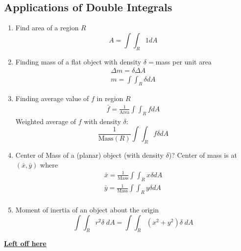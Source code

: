 \documentclass[../main.tex]{subfiles}
\begin{document}
\subsection{Applications of Double Integrals}
\begin{enumerate}
	\item Find area of a region $R$
	\begin{equation*}
		A = \int \int_R 1 dA 
	\end{equation*}
	\item Finding mass of a flat object with density $\delta = $mass per unit area
	\begin{align*}
		\Delta m = \delta \Delta A \\
		m = \int \int_R \delta dA
	\end{align*}
	\item Finding average value of $f$ in region $R$
	\begin{align*}
		\bar f = \frac1{\text{Area}} \int \int_R f dA
	\end{align*}
	Weighted average of $f$ with density $\delta$: 
	\begin{equation*}
		\frac1{\text{Mass}(R)} \int \int_R f \delta dA
	\end{equation*}
	\item Center of Mass of a (planar) object (with density $\delta$)? \newline
		Center of mass is at $(\bar x, \bar y)$ where 
		\begin{align*}
			\bar x = \frac1{\text{Mass}} \int \int_R x \delta dA \\
			\bar y = \frac1{\text{Mass}} \int \int_R y \delta dA \\
		\end{align*}
	\item Moment of inertia of an object about the origin
		\begin{equation*}
			\int \int_R r^2 \delta \; dA = \int \int_R (x^2 + y^2) \delta \; dA
		\end{equation*}
\end{enumerate}

\href{https://youtu.be/60e4hdCi1D4?t=1308}{\bf Left off here}
\end{document}
